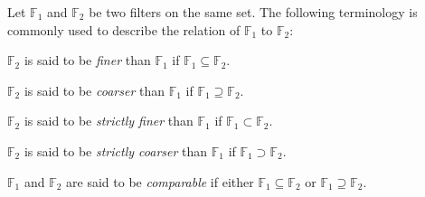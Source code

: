 \documentclass[12pt]{article}
\begin{document}
Let $\mathbb{F}_1$ and $\mathbb{F}_2$ be two filters on the same set.  The following terminology is commonly used to describe the relation of $\mathbb{F}_1$ to $\mathbb{F}_2$:

$\mathbb{F}_2$ is said to be \emph{finer} than $\mathbb{F}_1$ if $\mathbb{F}_1 \subseteq \mathbb{F}_2$.

$\mathbb{F}_2$ is said to be \emph{coarser} than $\mathbb{F}_1$ if $\mathbb{F}_1 \supseteq \mathbb{F}_2$.

$\mathbb{F}_2$ is said to be \emph{strictly finer} than $\mathbb{F}_1$ if $\mathbb{F}_1 \subset \mathbb{F}_2$.

$\mathbb{F}_2$ is said to be \emph{strictly coarser} than $\mathbb{F}_1$ if $\mathbb{F}_1 \supset \mathbb{F}_2$.

$\mathbb{F}_1$ and $\mathbb{F}_2$ are said to be \emph{comparable} if either $\mathbb{F}_1 \subseteq \mathbb{F}_2$ or $\mathbb{F}_1 \supseteq \mathbb{F}_2$.
\end{document}
